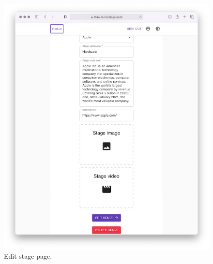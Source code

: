 \begin{figure}[H]
	\centering
	\includegraphics[width=\textwidth,keepaspectratio]{images/business_logic/stages_edit.png}
	\caption{Edit stage page.}
	\label{figure:edit-stage-page}
\end{figure}
